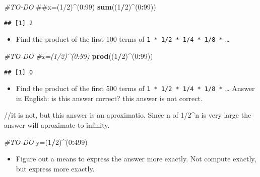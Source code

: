 \documentclass[]{article}
\newenvironment{Shaded}{\begin{snugshade}}{\end{snugshade}}
\newcommand{\KeywordTok}[1]{\textcolor[rgb]{0.13,0.29,0.53}{\textbf{#1}}}
\newcommand{\DecValTok}[1]{\textcolor[rgb]{0.00,0.00,0.81}{#1}}
\newcommand{\CommentTok}[1]{\textcolor[rgb]{0.56,0.35,0.01}{\textit{#1}}}
\newcommand{\OperatorTok}[1]{\textcolor[rgb]{0.81,0.36,0.00}{\textbf{#1}}}
\newcommand{\NormalTok}[1]{#1}
\providecommand{\tightlist}{%
  \setlength{\itemsep}{0pt}\setlength{\parskip}{0pt}}
\begin{document}
\begin{Shaded}
\begin{Highlighting}[]
\CommentTok{#TO-DO}
\NormalTok{##x=(1/2)^(0:99)}
\KeywordTok{sum}\NormalTok{((}\DecValTok{1}\OperatorTok{/}\DecValTok{2}\NormalTok{)}\OperatorTok{^}\NormalTok{(}\DecValTok{0}\OperatorTok{:}\DecValTok{99}\NormalTok{))}
\end{Highlighting}
\end{Shaded}

\begin{verbatim}
## [1] 2
\end{verbatim}

\begin{itemize}
\tightlist
\item
  Find the product of the first 100 terms of
  \texttt{1\ *\ 1/2\ *\ 1/4\ *\ 1/8\ *} \ldots{}
\end{itemize}

\begin{Shaded}
\begin{Highlighting}[]
\CommentTok{#TO-DO}
\CommentTok{#x=(1/2)^(0:99)}
\KeywordTok{prod}\NormalTok{((}\DecValTok{1}\OperatorTok{/}\DecValTok{2}\NormalTok{)}\OperatorTok{^}\NormalTok{(}\DecValTok{0}\OperatorTok{:}\DecValTok{99}\NormalTok{))}
\end{Highlighting}
\end{Shaded}

\begin{verbatim}
## [1] 0
\end{verbatim}

\begin{itemize}
\tightlist
\item
  Find the product of the first 500 terms of
  \texttt{1\ *\ 1/2\ *\ 1/4\ *\ 1/8\ *} \ldots{} Answer in English: is
  this answer correct? this answer is not correct.
\end{itemize}

//it is not, but this answer is an aproximatio. Since n of 1/2\^{}n is
very large the answer will aproximate to infinity.

\begin{Shaded}
\begin{Highlighting}[]
\CommentTok{#TO-DO}
\NormalTok{y=(}\DecValTok{1}\OperatorTok{/}\DecValTok{2}\NormalTok{)}\OperatorTok{^}\NormalTok{(}\DecValTok{0}\OperatorTok{:}\DecValTok{499}\NormalTok{)}
\end{Highlighting}
\end{Shaded}

\begin{itemize}
\tightlist
\item
  Figure out a means to express the answer more exactly. Not compute
  exactly, but express more exactly.
\end{itemize}
\end{document}
